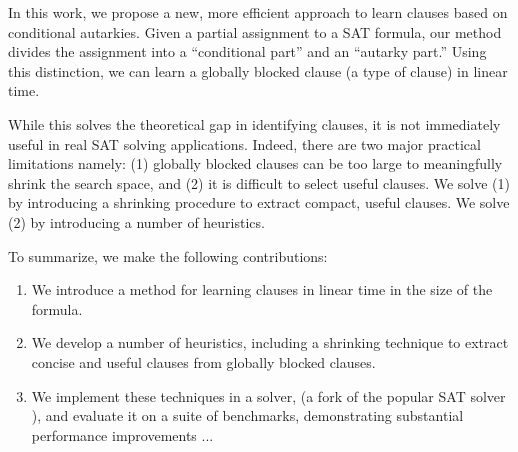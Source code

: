 In this work, we propose a new, more efficient approach to learn \pr clauses based on conditional autarkies. Given a partial assignment to a SAT formula, our method divides the assignment into a ``conditional part'' and an ``autarky part.'' Using this distinction, we can learn a globally blocked clause (a type of \pr clause) in linear time.

While this solves the theoretical gap in identifying \pr clauses, it is not immediately useful in real SAT solving applications. Indeed, there are two major practical limitations namely: (1) globally blocked clauses can be too large to meaningfully shrink the search space, and (2) it is difficult to select useful clauses. We solve (1) by introducing a shrinking procedure to extract compact, useful \pr clauses. We solve (2) by introducing a number of heuristics.



To summarize, we make the following contributions: 

\begin{enumerate} 
    \item We introduce a method for learning \pr clauses in linear time in the size of the formula. 
    \item We develop a number of heuristics, including a shrinking technique to extract concise and useful \pr clauses from globally blocked clauses. 
    \item We implement these techniques in a solver, \tool (a fork of the popular SAT solver \cadical), and evaluate it on a suite of benchmarks, demonstrating substantial performance improvements ... 
\end{enumerate}